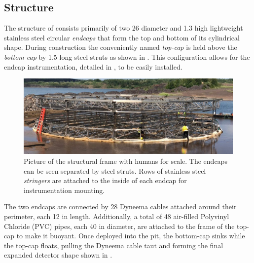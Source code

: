 \subsection{Structure} %
\label{sec:chips_detector_structure} %

The structure of \chipsfive consists primarily of two \SI{26}{} diameter and
\SI{1.3}{} high lightweight stainless steel circular \emph{endcaps} that form the top and
bottom of its cylindrical shape. During construction the conveniently named \emph{top-cap} is held
above the \emph{bottom-cap} by \SI{1.5}{} long steel struts as shown in
. This configuration allows for the endcap instrumentation, detailed in
, to be easily installed.

\begin{figure} %
    \includegraphics[width=\textwidth]{diagrams/4-chips/frame.pdf}
    \caption[Picture of the \chipsfive structural frame]
    {Picture of the \chipsfive structural frame with humans for scale. The endcaps can be seen
        separated by steel struts. Rows of stainless steel \emph{stringers} are attached to the
        inside of each endcap for instrumentation mounting.}
    \label{fig:frame}
\end{figure}

The two endcaps are connected by 28 Dyneema cables attached around their perimeter, each
\SI{12}{} in length. Additionally, a total of 48 air-filled Polyvinyl Chloride (PVC)
pipes, each \SI{40}{} in diameter, are attached to the frame of the top-cap to make it
buoyant. Once deployed into the pit, the bottom-cap sinks while the top-cap floats, pulling the
Dyneema cable taut and forming the final expanded detector shape shown in
.

